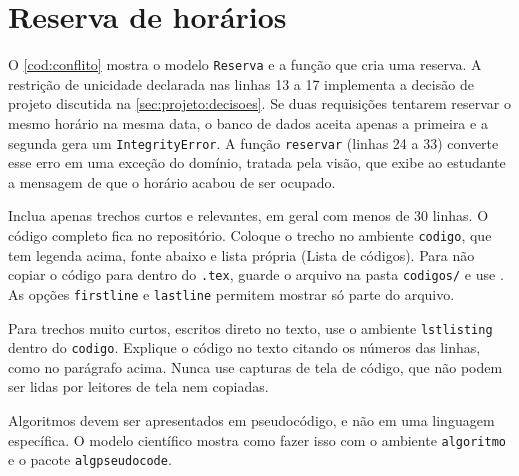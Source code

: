 \section{Reserva de horários}
\label{sec:implementacao:reserva}

O \cref{cod:conflito} mostra o modelo \texttt{Reserva} e a função que cria
uma reserva. A restrição de unicidade declarada nas linhas 13 a 17 implementa
a decisão de projeto discutida na \cref{sec:projeto:decisoes}. Se duas
requisições tentarem reservar o mesmo horário na mesma data, o banco de dados
aceita apenas a primeira e a segunda gera um \texttt{IntegrityError}. A
função \texttt{reservar} (linhas 24 a 33) converte esse erro em uma exceção
do domínio, tratada pela visão, que exibe ao estudante a mensagem de que o
horário acabou de ser ocupado.

\begin{codigo}[htbp]
  \caption{Modelo \texttt{Reserva} e função de reserva com tratamento de conflito}
  \label{cod:conflito}
  
  \fonteautor
\end{codigo}

\begin{instrucao}
Inclua apenas trechos curtos e relevantes, em geral com menos de 30 linhas.
O código completo fica no repositório. Coloque o trecho no ambiente
\verb|codigo|, que tem legenda acima, fonte abaixo e lista própria (Lista de
códigos). Para não copiar o código para dentro do \verb|.tex|, guarde o
arquivo na pasta \verb|codigos/| e use \verb||. As opções
\verb|firstline| e \verb|lastline| permitem mostrar só parte do arquivo.
\begin{exemplocodigo}
\begin{codigo}[htbp]
  \caption{Função de reserva}
  \label{cod:reserva}
  
  \fonteautor
\end{codigo}
\end{exemplocodigo}
Para trechos muito curtos, escritos direto no texto, use o ambiente
\verb|lstlisting| dentro do \verb|codigo|. Explique o código no texto citando
os números das linhas, como no parágrafo acima. Nunca use capturas de tela de
código, que não podem ser lidas por leitores de tela nem copiadas.

Algoritmos devem ser apresentados em pseudocódigo, e não em uma linguagem
específica. O modelo científico mostra como fazer isso com o ambiente
\verb|algoritmo| e o pacote \verb|algpseudocode|.
\end{instrucao}

